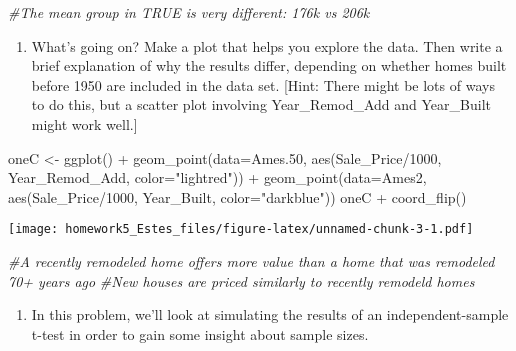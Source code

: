 \documentclass[
]{article}
\newenvironment{Shaded}{\begin{snugshade}}{\end{snugshade}}
\newcommand{\AttributeTok}[1]{\textcolor[rgb]{0.77,0.63,0.00}{#1}}
\newcommand{\CommentTok}[1]{\textcolor[rgb]{0.56,0.35,0.01}{\textit{#1}}}
\newcommand{\DecValTok}[1]{\textcolor[rgb]{0.00,0.00,0.81}{#1}}
\newcommand{\FloatTok}[1]{\textcolor[rgb]{0.00,0.00,0.81}{#1}}
\newcommand{\FunctionTok}[1]{\textcolor[rgb]{0.00,0.00,0.00}{#1}}
\newcommand{\NormalTok}[1]{#1}
\newcommand{\OtherTok}[1]{\textcolor[rgb]{0.56,0.35,0.01}{#1}}
\newcommand{\SpecialCharTok}[1]{\textcolor[rgb]{0.00,0.00,0.00}{#1}}
\newcommand{\StringTok}[1]{\textcolor[rgb]{0.31,0.60,0.02}{#1}}
\providecommand{\tightlist}{%
  \setlength{\itemsep}{0pt}\setlength{\parskip}{0pt}}
\begin{document}
\begin{Shaded}
\begin{Highlighting}[]
\CommentTok{\#The mean group in TRUE is very different: 176k vs 206k}
\end{Highlighting}
\end{Shaded}

\begin{enumerate}
\def\labelenumi{\alph{enumi}.}
\setcounter{enumi}{2}
\tightlist
\item
  What's going on? Make a plot that helps you explore the data. Then
  write a brief explanation of why the results differ, depending on
  whether homes built before 1950 are included in the data set. {[}Hint:
  There might be lots of ways to do this, but a scatter plot involving
  Year\_Remod\_Add and Year\_Built might work well.{]}
\end{enumerate}

\begin{Shaded}
\begin{Highlighting}[]
\NormalTok{oneC }\OtherTok{\textless{}{-}} 
  \FunctionTok{ggplot}\NormalTok{() }\SpecialCharTok{+}
  \FunctionTok{geom\_point}\NormalTok{(}\AttributeTok{data=}\NormalTok{Ames}\FloatTok{.50}\NormalTok{, }\FunctionTok{aes}\NormalTok{(Sale\_Price}\SpecialCharTok{/}\DecValTok{1000}\NormalTok{, Year\_Remod\_Add, }\AttributeTok{color=}\StringTok{"lightred"}\NormalTok{)) }\SpecialCharTok{+}
  \FunctionTok{geom\_point}\NormalTok{(}\AttributeTok{data=}\NormalTok{Ames2, }\FunctionTok{aes}\NormalTok{(Sale\_Price}\SpecialCharTok{/}\DecValTok{1000}\NormalTok{,  Year\_Built, }\AttributeTok{color=}\StringTok{"darkblue"}\NormalTok{))}
\NormalTok{oneC }\SpecialCharTok{+} \FunctionTok{coord\_flip}\NormalTok{()}
\end{Highlighting}
\end{Shaded}

\texttt{[image: homework5\_Estes\_files/figure-latex/unnamed-chunk-3-1.pdf]}

\begin{Shaded}
\begin{Highlighting}[]
\CommentTok{\#A recently remodeled home offers more value than a home that was remodeled 70+ years ago}
\CommentTok{\#New houses are priced similarly to recently remodeld homes}
\end{Highlighting}
\end{Shaded}

\begin{enumerate}
\def\labelenumi{\arabic{enumi}.}
\setcounter{enumi}{1}
\tightlist
\item
  In this problem, we'll look at simulating the results of an
  independent-sample t-test in order to gain some insight about sample
  sizes.
\end{enumerate}
\end{document}
